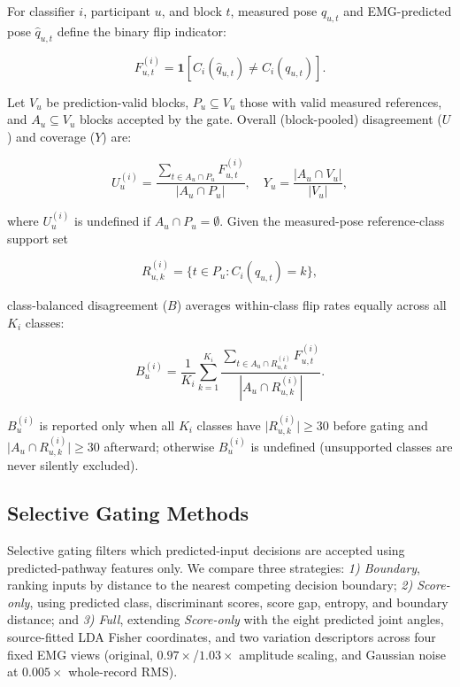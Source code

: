 \documentclass[conference,letterpaper]{IEEEtran}
\begin{document}
For classifier $i$, participant $u$, and block $t$, measured pose $q_{u,t}$ and EMG-predicted pose $\hat{q}_{u,t}$ define the binary flip indicator:

\begin{equation}
F_{u,t}^{(i)} = \mathbf{1}\left[C_i(\hat{q}_{u,t}) \neq C_i(q_{u,t})\right].
\end{equation}

Let $V_u$ be prediction-valid blocks, $P_u \subseteq V_u$ those with valid measured references, and $A_u \subseteq V_u$ blocks accepted by the gate. Overall (block-pooled) disagreement ($U$) and coverage ($Y$) are:

\begin{equation}
U_u^{(i)} = \frac{\sum_{t \in A_u \cap P_u} F_{u,t}^{(i)}}{|A_u \cap P_u|}, \quad Y_u = \frac{|A_u \cap V_u|}{|V_u|},
\end{equation}

where $U_u^{(i)}$ is undefined if $A_u \cap P_u = \emptyset$. Given the measured-pose reference-class support set

\begin{equation}
R_{u,k}^{(i)} = \{t \in P_u : C_i(q_{u,t}) = k\},
\end{equation}

class-balanced disagreement ($B$) averages within-class flip rates equally across all $K_i$ classes:

\begin{equation}
B_u^{(i)} = \frac{1}{K_i} \sum_{k=1}^{K_i} \frac{\sum_{t \in A_u \cap R_{u,k}^{(i)}} F_{u,t}^{(i)}}{|A_u \cap R_{u,k}^{(i)}|}.
\end{equation}

$B_u^{(i)}$ is reported only when all $K_i$ classes have $\vert{}R_{u,k}^{(i)}\vert{} \ge 30$ before gating and $\vert{}A_u \cap R_{u,k}^{(i)}\vert{} \ge 30$ afterward; otherwise $B_u^{(i)}$ is undefined (unsupported classes are never silently excluded).

\subsection{Selective Gating Methods}

Selective gating filters which predicted-input decisions are accepted using predicted-pathway features only. We compare three strategies: \textit{1) Boundary}, ranking inputs by distance to the nearest competing decision boundary; \textit{2) Score-only}, using predicted class, discriminant scores, score gap, entropy, and boundary distance; and \textit{3) Full}, extending \textit{Score-only} with the eight predicted joint angles, source-fitted LDA Fisher coordinates, and two variation descriptors across four fixed EMG views (original, $0.97\times$/$1.03\times$ amplitude scaling, and Gaussian noise at $0.005\times$ whole-record RMS).
\end{document}
